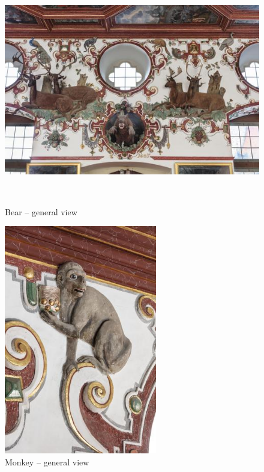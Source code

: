 \documentclass[
  a4paper,
  openany]{book}
\begin{document}
\begin{figure}[H]
\centering
\includegraphics[height=10cm]{./images/fmd10005865a.jpg}
\caption{Bear – general view}
\label{fig:{https://previous.bildindex.de/bilder/fmd10005865a.jpg}}
\end{figure}

\clearpage

\begin{figure}[H]
\centering
\includegraphics[height=10cm]{./images/fmd10005867a.jpg}
\caption{Monkey – general view}
\label{fig:{https://previous.bildindex.de/bilder/fmd10005867a.jpg}}
\end{figure}

\clearpage
\end{document}
